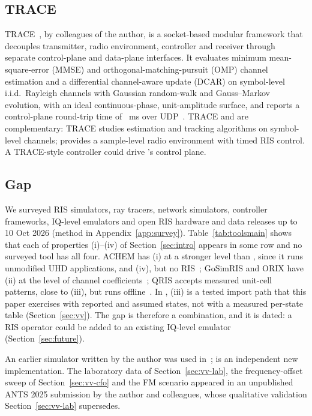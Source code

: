 \subsection{TRACE}
TRACE~\cite{Kumar2026TRACE}, by colleagues of the author, is a
socket-based modular framework that decouples transmitter, radio environment, controller
and receiver through separate control-plane and data-plane interfaces. It evaluates minimum mean-square-error
(MMSE) and orthogonal-matching-pursuit (OMP) channel estimation and a differential channel-aware update (DCAR) on symbol-level
i.i.d.\ Rayleigh channels with Gaussian random-walk and Gauss--Markov evolution, with an
ideal continuous-phase, unit-amplitude surface, and reports a control-plane round-trip
time of \numRepTraceRttMs~ms over UDP~\cite{Kumar2026TRACE}. TRACE and \sremu{} are complementary: TRACE
studies estimation and tracking algorithms on symbol-level channels; \sremu{} provides a
sample-level radio environment with timed RIS control. A TRACE-style controller could
drive \sremu{}'s control plane.

\subsection{Gap}\label{sec:related-gap}
We surveyed RIS simulators, ray tracers, network simulators, controller
frameworks, IQ-level emulators and open RIS hardware and data releases up to 10 Oct 2026
(method in Appendix~\ref{app:survey}). Table~\ref{tab:toolsmain} shows that each of properties (i)--(iv) of
Section~\ref{sec:intro} appears in some row and no surveyed tool has all four. ACHEM
has (i) at a stronger level than \sremu{}, since it runs unmodified UHD applications, and
(iv), but no RIS~\cite{Gurses2026ACHEM}; GoSimRIS and ORIX have (ii) at the level of channel
coefficients~\cite{ElGhalbzouri2025GoSimRIS,Kayraklik2026ORIX}; QRIS accepts measured unit-cell
patterns, close to (iii), but runs offline~\cite{Burtakov2023QRIS}. In \sremu{}, (iii) is a
tested import path that this paper exercises with reported and assumed states, not with a
measured per-state table (Section~\ref{sec:vv}). The gap is therefore a combination, and it is
dated: a RIS operator could be added to an existing IQ-level emulator
(Section~\ref{sec:future}).

An earlier simulator written by the author was used
in~\cite{Mishra2025WCL,Mishra2025NCC}; \sremu{} is an independent new implementation.
The laboratory data of Section~\ref{sec:vv-lab}, the frequency-offset
sweep of Section~\ref{sec:vv-cfo} and the FM scenario appeared in an unpublished ANTS 2025
submission by the author and colleagues, whose qualitative validation Section~\ref{sec:vv-lab} supersedes.
